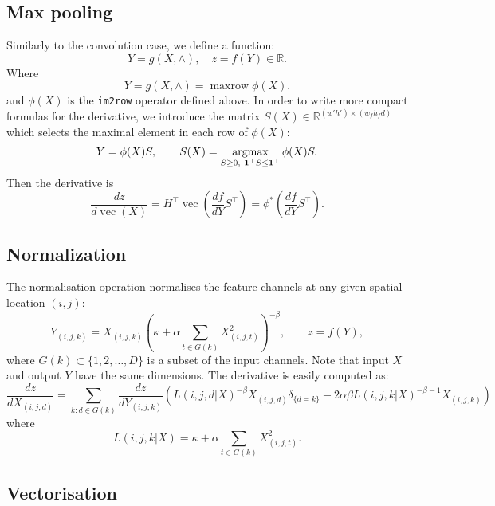 \documentclass[12pt]{article}
\newcommand{\real}{\mathbb{R}}
\newcommand{\vv}{\operatorname{vec}}
\begin{document}
\subsection{Max pooling}\label{s:pooling}

Similarly to the convolution case, we define a function:
\[
 Y = g(X,\wedge), \quad z = f(Y) \in \real.
\]
Where
\[
\boxed{Y = g(X,\wedge) = \operatorname{maxrow}\phi(X).}
\]
and $\phi(X)$ is the {\tt im2row} operator defined above. In order to write more compact formulas for the derivative, we introduce the matrix $S(X) \in \real^{(w'h')
\times(w_fh_fd)}$ which selects the maximal element in each row of $\phi(X)$:
\[
  Y = \phi(X)S,
  \qquad
   S(X) = \operatornamewithlimits{argmax}_{S \geq 0,\ \mathbf{1}^\top S \leq \mathbf{1}^\top} \phi(X) S.
\]
Then the derivative is
\[
\boxed{
\frac{d z}{d \vv(X)}
=
H^\top
\vv\left(
\frac{d f}{d Y}S^\top
\right)
=
\phi^*\left(
\frac{d f}{d Y}S^\top
\right).
}
\]

\subsection{Normalization}\label{s:normalization}

The normalisation operation normalises the feature channels at any given spatial location $(i,j)$:
\[
 Y_{(i,j,k)} = X_{(i,j,k)} \left( \kappa + \alpha \sum_{t\in G(k)} X_{(i,j,t)}^2 \right)^{-\beta},
 \qquad
 z = f(Y),
\]
where $G(k) \subset \{1, 2, \dots, D\}$ is a subset of the input channels. Note that input $X$ and output $Y$ have the same dimensions. The derivative is easily computed as:
\[
\frac{dz}{d X_{(i,j,d)}}
=
\sum_{k:d\in G(k)}
\frac{dz}{d Y_{(i,j,k)}}
\left(
L(i,j,d|X)^{-\beta}X_{(i,j,d)} \delta_{\{d=k\}}
-
2 \alpha\beta L(i,j,k|X)^{-\beta-1} X_{(i,j,k)}
\right)
\]
where
\[
 L(i,j,k|X) = \kappa + \alpha \sum_{t\in G(k)} X_{(i,j,t)}^2.
\]

\subsection{Vectorisation}\label{s:vectorisation}
\end{document}
